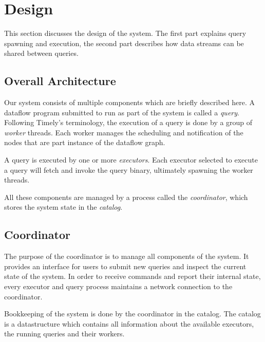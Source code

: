 \chapter{Design}\label{ch:design}

This section discusses the design of the system. The first part explains query
spawning and execution, the second part describes how data streams can be shared
between queries.

\section{Overall Architecture}

Our system consists of multiple components which are briefly described here.
A dataflow program submitted to run as part of the system is
called a \emph{query}. Following Timely's terminology, the execution of a query
is done by a group of \emph{worker} threads. Each worker manages the scheduling and
notification of the nodes that are part instance of the dataflow graph. 

A query is executed by one or more \emph{executors}. Each executor selected to
execute a query will fetch and invoke the query binary, ultimately spawning the
worker threads. 

All these components are managed by a process called the \emph{coordinator},
which stores the system state in the \emph{catalog}.

\section{Coordinator}

The purpose of the coordinator is to manage all components of the system. It
provides an interface for users to submit new queries and inspect the current
state of the system. In order to receive commands and report their internal state,
every executor and query process maintains a network connection to the coordinator.

Bookkeeping of the system is done by the coordinator in the catalog. The
catalog is a datastructure which contains all information about the available
executors, the running queries and their workers. 

